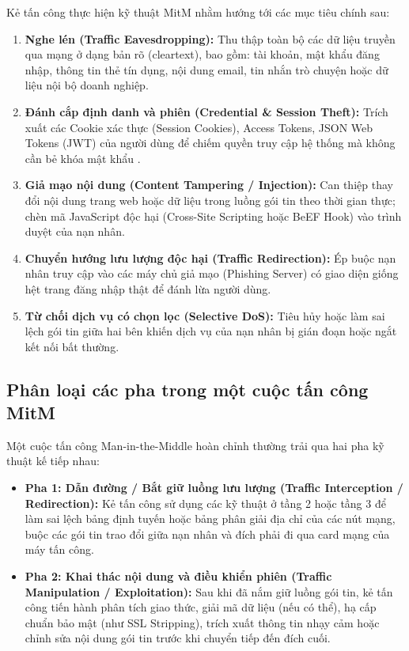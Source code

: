 Kẻ tấn công thực hiện kỹ thuật MitM nhằm hướng tới các mục tiêu chính sau:
\begin{enumerate}
  \item \textbf{Nghe lén (Traffic Eavesdropping):} Thu thập toàn bộ các dữ liệu truyền qua mạng ở dạng bản rõ (cleartext), bao gồm: tài khoản, mật khẩu đăng nhập, thông tin thẻ tín dụng, nội dung email, tin nhắn trò chuyện hoặc dữ liệu nội bộ doanh nghiệp.
  \item \textbf{Đánh cắp định danh và phiên (Credential \& Session Theft):} Trích xuất các Cookie xác thực (Session Cookies), Access Tokens, JSON Web Tokens (JWT) của người dùng để chiếm quyền truy cập hệ thống mà không cần bẻ khóa mật khẩu \cite{kurose2021computer}.
  \item \textbf{Giả mạo nội dung (Content Tampering / Injection):} Can thiệp thay đổi nội dung trang web hoặc dữ liệu trong luồng gói tin theo thời gian thực; chèn mã JavaScript độc hại (Cross-Site Scripting hoặc BeEF Hook) vào trình duyệt của nạn nhân.
  \item \textbf{Chuyển hướng lưu lượng độc hại (Traffic Redirection):} Ép buộc nạn nhân truy cập vào các máy chủ giả mạo (Phishing Server) có giao diện giống hệt trang đăng nhập thật để đánh lừa người dùng.
  \item \textbf{Từ chối dịch vụ có chọn lọc (Selective DoS):} Tiêu hủy hoặc làm sai lệch gói tin giữa hai bên khiến dịch vụ của nạn nhân bị gián đoạn hoặc ngắt kết nối bất thường.
\end{enumerate}

\subsection{Phân loại các pha trong một cuộc tấn công MitM}

Một cuộc tấn công Man-in-the-Middle hoàn chỉnh thường trải qua hai pha kỹ thuật kế tiếp nhau:
\begin{itemize}
  \item \textbf{Pha 1: Dẫn đường / Bắt giữ luồng lưu lượng (Traffic Interception / Redirection):} Kẻ tấn công sử dụng các kỹ thuật ở tầng 2 hoặc tầng 3 để làm sai lệch bảng định tuyến hoặc bảng phân giải địa chỉ của các nút mạng, buộc các gói tin trao đổi giữa nạn nhân và đích phải đi qua card mạng của máy tấn công.
  \item \textbf{Pha 2: Khai thác nội dung và điều khiển phiên (Traffic Manipulation / Exploitation):} Sau khi đã nắm giữ luồng gói tin, kẻ tấn công tiến hành phân tích giao thức, giải mã dữ liệu (nếu có thể), hạ cấp chuẩn bảo mật (như SSL Stripping), trích xuất thông tin nhạy cảm hoặc chỉnh sửa nội dung gói tin trước khi chuyển tiếp đến đích cuối.
\end{itemize}

